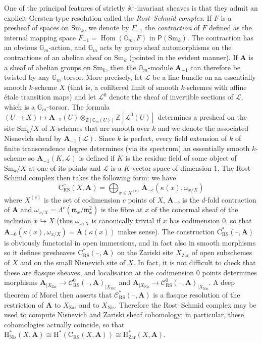 \documentclass[11pt,leqno]{amsart}
\newcommand{\Hom}{\operatorname{Hom}}
\renewcommand{\1}{{\rm 1\hspace*{-0.4ex}%
\rule{0.1ex}{1.52ex}\hspace*{0.2ex}}}
\newcommand{\gm}[1]{{{\mathbb G}_{m}^{#1}}}
\newcommand{\Gm}{{\gm{}}}
\renewcommand{\Lc}{{\mathcal L}}
\newcommand{\Nis}{{\operatorname{Nis}}}
\newcommand{\Zar}{\operatorname{Zar}} %
\newcommand{\Sm}{\mathrm{Sm}}
\newcommand{\Hr}{{\mathrm {H}}}
\newcommand{\<}[1]{{\langle}#1 {\rangle}}
\newcommand{\Abf}{\mathbf{A}}
\newcommand{\Cr}{\mathrm{C}}
\newcommand{\RS}{\mathrm{RS}}
\newcommand{\Zb}{\mathbb{Z}}
\newcommand{\Abb}{\mathbb{A}}
\theoremstyle{plain}
\theoremstyle{definition}
\theoremstyle{remark}
\numberwithin{equation}{section}
\begin{document}
One of the principal features of strictly $\Abb^1$-invariant sheaves is that they admit an explicit Gersten-type resolution called the \emph{Rost--Schmid complex}. If $F$ is a presheaf of spaces on $\Sm_k$, we denote by $F_{-1}$ the \emph{contraction} of $F$ defined as the internal mapping space $F_{-1}=\underline{\Hom}(\Gm,F)$ in $\mathsf{P}(\Sm_k)$. The contraction has an obvious $\mathbb{G}_m$-action, and $\mathbb{G}_m$ acts by group sheaf automorphisms on the contractions of an abelian sheaf on $\Sm_k$ (pointed in the evident manner). If $\Abf$ is a sheaf of abelian groups on $\Sm_k$, then the $\Gm$-module $\Abf_{-1}$ can therefore be twisted by any $\Gm$-torsor. More precisely, let $\Lc$ be a line bundle on an essentially smooth $k$-scheme $X$ (that is, a cofiltered limit of smooth $k$-schemes with affine étale transition maps) and let $\Lc^0$ denote the sheaf of invertible sections of $\Lc$, which is a $\Gm$-torsor. The formula $(U\rightarrow X)\mapsto\Abf_{-1}(U)\otimes_{\Zb[\mathbb{G}_m(U)]}\Zb[\Lc^0(U)]$ determines a presheaf on the site $\Sm_k/X$ of $X$-schemes that are smooth over $k$ and we denote the associated Nisnevich sheaf by $\Abf_{-1}(\Lc)$. Since $k$ is perfect, every field extension of $k$ of finite transcendence degree determines (via its spectrum) an essentially smooth $k$-scheme so $\Abf_{-1}(K,\Lc)$ is defined if $K$ is the residue field of some object of $\Sm_k/X$ at one of its points and $\Lc$ is a $K$-vector space of dimension $1$. The Rost--Schmid complex then takes the following form: we have \[\Cr_\RS^c(X,\Abf)=\bigoplus_{x\in X^{(c)}}\Abf_{-c}(\kappa(x),\omega_{x/X})\] where $X^{(c)}$ is the set of codimension $c$ points of $X$, $\Abf_{-c}$ is the $d$-fold contraction of $\Abf$ and $\omega_{x/X}=\Lambda^c(\mathfrak{m}_x/\mathfrak{m}_x^2)$ is the fibre at $x$ of the conormal sheaf of the inclusion $x\hookrightarrow X$ (thus $\omega_{x/X}$ is canonically trivial if $x$ has codimension $0$, so that $\Abf_{-0}(\kappa(x),\omega_{x/X})=\Abf(\kappa(x))$ makes sense). The construction $\Cr_\RS^*(\text{--},\Abf)$ is obviously functorial in open immersions, and in fact also in smooth morphisms so it defines presheaves $\Cr_\RS^*(\text{--},\Abf)$ on the Zariski site $X_{\Zar}$ of open subschemes of $X$ and on the small Nisnevich site of $X$. In fact, it is not difficult to check that these are flasque sheaves, and localisation at the codimension $0$ points determines morphisms $\Abf_{|X_{\Zar}}\rightarrow\mathscr{C}_\RS^0(\text{--},\Abf)_{|X_{\Zar}}$ and $\Abf_{|X_{\Nis}}\rightarrow\mathscr{C}_\RS^0(\text{--},\Abf)_{|X_{\Nis}}$. A deep theorem of Morel \cite[Corollary 5.43]{morelA1AlgebraicTopologyField2012} then asserts that $\mathscr{C}_\RS^*(\text{--},\Abf)$ is a flasque resolution of the restriction of $\Abf$ to $X_{\Zar}$ and to $X_{\Nis}$. Therefore the Rost--Schmid complex may be used to compute Nisnevich and Zariski sheaf cohomology; in particular, these cohomologies actually coincide, so that $\Hr_{\Nis}^*(X,\Abf)\cong\Hr^*(\Cr_\RS(X,\Abf))\cong\Hr_{\Zar}^*(X,\Abf)$.
\end{document}
